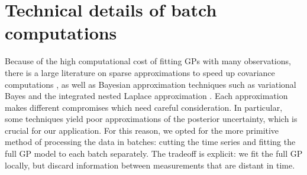 \section{Technical details of batch computations}
\label{appendix:batch_details}

Because of the high computational cost of fitting GPs with many observations,
there is a large literature on sparse approximations to speed up
covariance computations \citep{quinonero2007approximation, banerjee2008gaussian, banerjee2014hierarchical},
as well as Bayesian approximation techniques such as variational Bayes \citep{beal2003variational,jordan1999introduction,ren2011variational} and the integrated nested Laplace approximation \citep{rue2009approximate}.
Each approximation makes different compromises which need careful consideration.
In particular, some techniques yield poor approximations of the posterior uncertainty,
which is crucial for our application.
For this reason, we opted for the more primitive method of processing the data
in batches: cutting the time series and fitting the full GP
model to each batch separately.
The tradeoff is explicit: we fit the full GP locally, but discard information between
measurements that are distant in time.

